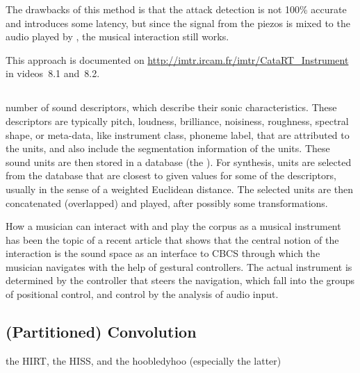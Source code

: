 The drawbacks of this method is that the attack detection is not 100\% accurate and introduces some latency, but since the signal from the piezos is mixed to the
audio played by \catart, the musical interaction still works.


This approach is documented on \url{http://imtr.ircam.fr/imtr/CataRT_Instrument} in videos~8.1 and~8.2.


\subsection{\CBCS}


number of sound descriptors, which describe their sonic characteristics.
These descriptors are typically pitch, loudness, brilliance, noisiness, roughness, spectral shape, or meta-data, like instrument class, phoneme label, that are attributed to the units,
and also include the segmentation information of the units.
These sound units are then stored in a database (the ).  For synthesis, units are
selected from the database that are closest to given  values for some of the
descriptors, usually in the sense of a weighted Euclidean distance.
The selected units are then concatenated (overlapped) and played, after possibly some transformations.


How a musician can interact with and play the corpus as a musical instrument has been the topic of a recent article \cite{Schwarz-nime2012-sound-space} that shows that the central notion of the interaction is the sound space as an interface to CBCS through which the musician navigates with the help of gestural controllers.  
The actual instrument is determined by the controller that steers the
navigation, which fall into the groups of positional control, and control by the analysis of audio
input.


\subsection{(Partitioned) Convolution}


the HIRT, the HISS, and the hoobledyhoo (especially the latter)
